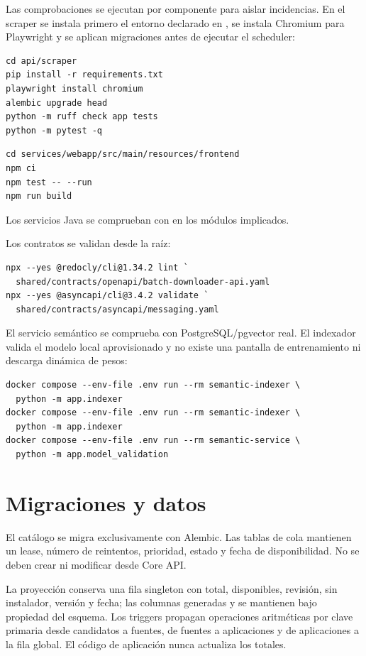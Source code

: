 Las comprobaciones se ejecutan por componente para aislar incidencias. En el scraper se instala primero el entorno declarado en , se instala Chromium para Playwright y se aplican migraciones antes de ejecutar el scheduler:

\begin{verbatim}
cd api/scraper
pip install -r requirements.txt
playwright install chromium
alembic upgrade head
python -m ruff check app tests
python -m pytest -q
\end{verbatim}

\begin{verbatim}
cd services/webapp/src/main/resources/frontend
npm ci
npm test -- --run
npm run build
\end{verbatim}

Los servicios Java se comprueban con  en los módulos implicados.

Los contratos se validan desde la raíz:

\begin{verbatim}
npx --yes @redocly/cli@1.34.2 lint `
  shared/contracts/openapi/batch-downloader-api.yaml
npx --yes @asyncapi/cli@3.4.2 validate `
  shared/contracts/asyncapi/messaging.yaml
\end{verbatim}

El servicio semántico se comprueba con PostgreSQL/pgvector real. El indexador valida el modelo local aprovisionado y no existe una pantalla de entrenamiento ni descarga dinámica de pesos:

\begin{verbatim}
docker compose --env-file .env run --rm semantic-indexer \
  python -m app.indexer
docker compose --env-file .env run --rm semantic-indexer \
  python -m app.indexer
docker compose --env-file .env run --rm semantic-service \
  python -m app.model_validation
\end{verbatim}

\section{Migraciones y datos}

El catálogo se migra exclusivamente con Alembic. Las tablas de cola mantienen un lease, número de reintentos, prioridad, estado y fecha de disponibilidad. No se deben crear ni modificar desde Core API.

La proyección  conserva una fila singleton con total, disponibles, revisión, sin instalador, versión y fecha; las columnas generadas  y  se mantienen bajo propiedad del esquema. Los triggers propagan operaciones aritméticas por clave primaria desde candidatos a fuentes, de fuentes a aplicaciones y de aplicaciones a la fila global. El código de aplicación nunca actualiza los totales.

